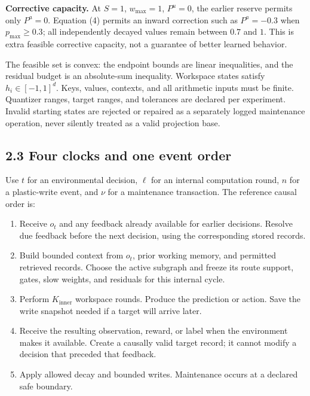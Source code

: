 \documentclass[
  11pt,
  a4paper,
]{article}
\providecommand{\tightlist}{%
  \setlength{\itemsep}{0pt}\setlength{\parskip}{0pt}}
\begin{document}
\textbf{Corrective capacity.} At \(S=1\), \(w_{\max}=1\), \(P^u=0\), the
earlier reserve permits only \(P^a=0\). Equation (4) permits an inward
correction such as \(P^a=-0.3\) when \(p_{\max}\ge0.3\); all
independently decayed values remain between \(0.7\) and \(1\). This is
extra feasible corrective capacity, not a guarantee of better learned
behavior.

The feasible set is convex: the endpoint bounds are linear inequalities,
and the residual budget is an absolute-sum inequality. Workspace states
satisfy \(h_i\in[-1,1]^d\). Keys, values, contexts, and all arithmetic
inputs must be finite. Quantizer ranges, target ranges, and tolerances
are declared per experiment. Invalid starting states are rejected or
repaired as a separately logged maintenance operation, never silently
treated as a valid projection base.

\subsection{2.3 Four clocks and one event
order}\label{four-clocks-and-one-event-order}

Use \(t\) for an environmental decision, \(\ell\) for an internal
computation round, \(n\) for a plastic-write event, and \(\nu\) for a
maintenance transaction. The reference causal order is:

\begin{enumerate}
\def\labelenumi{\arabic{enumi}.}
\tightlist
\item
  Receive \(o_t\) and any feedback already available for earlier
  decisions. Resolve due feedback before the next decision, using the
  corresponding stored records.
\item
  Build bounded context from \(o_t\), prior working memory, and
  permitted retrieved records. Choose the active subgraph and freeze its
  route support, gates, slow weights, and residuals for this internal
  cycle.
\item
  Perform \(K_{\mathrm{inner}}\) workspace rounds. Produce the
  prediction or action. Save the write snapshot needed if a target will
  arrive later.
\item
  Receive the resulting observation, reward, or label when the
  environment makes it available. Create a causally valid target record;
  it cannot modify a decision that preceded that feedback.
\item
  Apply allowed decay and bounded writes. Maintenance occurs at a
  declared safe boundary.
\end{enumerate}
\end{document}
